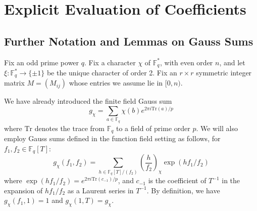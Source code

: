 \documentclass[11pt,letterpaper]{article}
\theoremstyle{definition}
\theoremstyle{remark}
\numberwithin{equation}{section}
\theoremstyle{dotless}
\newcommand{\F}{\mathbb{F}}
\newcommand{\res}[2]{\left(\frac{#1}{#2}\right)}
\begin{document}
 \section{Explicit Evaluation of Coefficients} \label{SectionCoeffs}

 \subsection{Further Notation and Lemmas on Gauss Sums}

 Fix an odd prime power $q$. Fix a character $\chi$ of $\F_q^*$, with even order $n$, and let $\xi:\F_q^* \to \lbrace \pm 1 \rbrace$ be the unique character of order 2. Fix an $r\times r$ symmetric integer matrix $M=(M_{ij})$ whose entries we assume lie in $[0,n)$. 

 We have already introduced the finite field Gauss sum
\begin{equation}\label{ff-gauss-sum}
g_\chi=\sum_{a \in \F_q} \chi(b) e^{2 \pi i \mathrm{Tr}(a)/p}
\end{equation}
where $\mathrm{Tr}$ denotes the trace from $\F_q$ to a field of prime order $p$. We will also employ Gauss sums defined in the function field setting as follows, for $f_1, f_2 \in \F_q[T]$:
\begin{equation} \label{GaussSumDefn}
g_\chi(f_1, f_2)=\sum_{h \in \F_q[T]/(f_2)} \res{h}{f_2}_\chi \exp(h f_1/f_2) 
\end{equation}
where $\exp(h f_1/f_2) = e^{2 \pi i \mathrm{Tr}(c_{-1})/p}$, and $c_{-1}$ is the coefficient of $T^{-1}$ in the expansion of $h f_1/f_2$ as a Laurent series in $T^{-1}$. By definition, we have $g_\chi(f_1, 1)=1$ and $g_{\chi}(1, T)=g_{\chi}$. 
\end{document}
